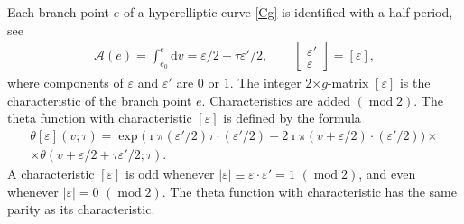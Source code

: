 \documentclass[twoside]{amsart}
\newcommand{\rmd}{\mathrm{d}}
\DeclareMathOperator{\modR}{mod}
\theoremstyle{definition}
\theoremstyle{plain}
\begin{document}
Each branch point $e$ of a hyperelliptic curve \eqref{Cg} is identified with a half-period,
see \cite[\S\,202]{bak897}
\begin{gather}\label{AbelMBranchP}
 \mathcal{A}(e) = \int_{e_0}^{e} \rmd v = \varepsilon/2 + \tau \varepsilon'/2,
 \qquad \begin{bmatrix} \varepsilon' \\ 
\varepsilon \end{bmatrix} = [\varepsilon],
\end{gather}
where components of $\varepsilon$ and $\varepsilon'$ are $0$ or $1$.
The integer $2{\times g}$-matrix $[\varepsilon]$ is the characteristic of the branch point $e$.
Characteristics are added $(\modR 2)$.
The theta function with characteristic $[\varepsilon]$ is defined by the formula
\begin{multline}\label{ThetaDef}
 \theta[\varepsilon](v;\tau) = \exp\big(\imath \pi (\varepsilon'/2) \tau \cdot (\varepsilon'/2)
 + 2 \imath \pi  (v+\varepsilon/2)\cdot(\varepsilon'/2)\big) \times \\ \times \theta(v+\varepsilon/2 + \tau \varepsilon'/2;\tau).
\end{multline}
A characteristic $[\varepsilon]$ is odd whenever $|\varepsilon|\equiv  \varepsilon \cdot \varepsilon'{}  = 1$ $(\modR 2)$, 
and even whenever $|\varepsilon|= 0$ $(\modR 2 )$. The theta function with characteristic
has the same parity as its characteristic.



\end{document}
